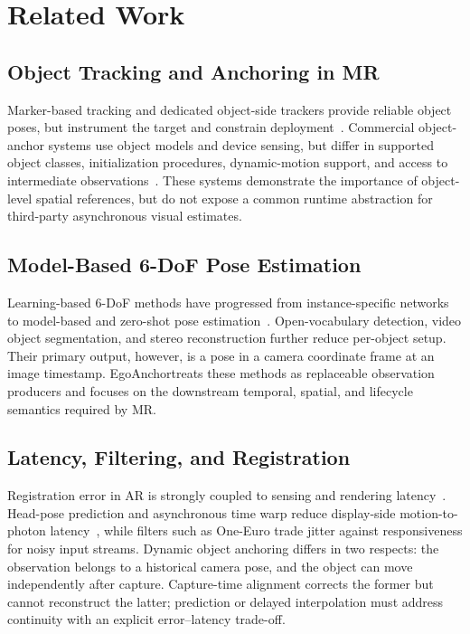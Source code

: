 \documentclass[review]{vgtc}
\newcommand{\system}{EgoAnchor}
\begin{document}
\section{Related Work}
\subsection{Object Tracking and Anchoring in MR}
Marker-based tracking and dedicated object-side trackers provide reliable object poses, but instrument the target and constrain deployment~\cite{kato1999artoolkit,olson2011apriltag,garridojurado2014aruco}. Commercial object-anchor systems use object models and device sensing, but differ in supported object classes, initialization procedures, dynamic-motion support, and access to intermediate observations~\cite{appleObjectAnchor,azureObjectAnchors,vuforiaModelTargets,metaDynamicObjectTracker}. These systems demonstrate the importance of object-level spatial references, but do not expose a common runtime abstraction for third-party asynchronous visual estimates.

\subsection{Model-Based 6-DoF Pose Estimation}
Learning-based 6-DoF methods have progressed from instance-specific networks to model-based and zero-shot pose estimation~\cite{posecnn2017,densefusion2019,cosypose2020,megapose2022,foundationpose2023}. Open-vocabulary detection, video object segmentation, and stereo reconstruction further reduce per-object setup. Their primary output, however, is a pose in a camera coordinate frame at an image timestamp. \system treats these methods as replaceable observation producers and focuses on the downstream temporal, spatial, and lifecycle semantics required by MR.

\subsection{Latency, Filtering, and Registration}
Registration error in AR is strongly coupled to sensing and rendering latency~\cite{azuma1994improving,diluca2010latency}. Head-pose prediction and asynchronous time warp reduce display-side motion-to-photon latency~\cite{vanwaveren2016atw}, while filters such as One-Euro trade jitter against responsiveness for noisy input streams. Dynamic object anchoring differs in two respects: the observation belongs to a historical camera pose, and the object can move independently after capture. Capture-time alignment corrects the former but cannot reconstruct the latter; prediction or delayed interpolation must address continuity with an explicit error--latency trade-off.
\end{document}

